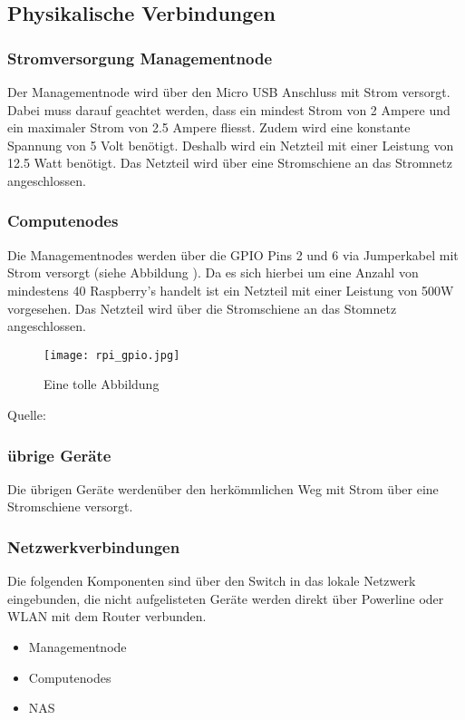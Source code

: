 \subsection{Physikalische Verbindungen}

\subsubsection{Stromversorgung Managementnode}
Der Managementnode wird über den Micro USB Anschluss mit Strom versorgt. Dabei muss darauf geachtet werden, dass ein mindest Strom von 2 Ampere und ein maximaler Strom von 2.5 Ampere fliesst. Zudem wird eine konstante Spannung von 5 Volt benötigt. Deshalb wird ein Netzteil mit einer Leistung von 12.5 Watt benötigt. Das Netzteil wird über eine Stromschiene an das Stromnetz angeschlossen.

\subsubsection{Computenodes}
Die Managementnodes werden über die GPIO Pins 2 und 6 via Jumperkabel mit Strom versorgt (siehe Abbildung ). Da es sich hierbei um eine Anzahl von mindestens 40 Raspberry's handelt ist ein Netzteil mit einer Leistung von 500W vorgesehen. Das Netzteil wird über die Stromschiene an das Stomnetz angeschlossen.

\begin{figure}[H]
\centering
\texttt{[image: rpi\_gpio.jpg]}
\caption{Eine tolle Abbildung \citep[Quelle:]{https://developer-blog.net/wp-content/uploads/2013/09/raspberry-pi-rev2-gpio-pinout-1024x715.jpg}} 
\label{fig:GPIO Anschlüsse}
\end{figure} 

Quelle: 

\subsubsection{übrige Geräte}
Die übrigen Geräte werdenüber den herkömmlichen Weg mit Strom über eine Stromschiene versorgt.

\subsubsection{Netzwerkverbindungen}
Die folgenden Komponenten sind über den Switch in das lokale Netzwerk eingebunden, die nicht aufgelisteten Geräte werden direkt über Powerline oder WLAN mit dem Router verbunden.
\begin{itemize}
\item Managementnode
\item Computenodes
\item NAS
\end{itemize}


